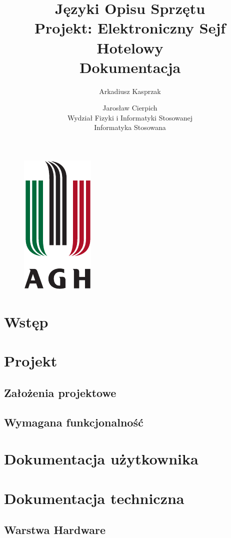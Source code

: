 \documentclass[12pt] {article}
\title {
	Języki Opisu Sprzętu \\
	\large Projekt: Elektroniczny Sejf Hotelowy \\
	Dokumentacja}
\author {
	Arkadiusz Kasprzak \and Jarosław Cierpich \\
	Wydział Fizyki i Informatyki Stosowanej \\ 
	Informatyka Stosowana}
\begin{document}
\begin{figure}
\centering
\includegraphics[scale = 1.5]{res/agh_znk_wbr_cmyk}
\end{figure}

\maketitle

\newpage
\tableofcontents

\section{Wstęp}

\section{Projekt}
\subsection{Założenia projektowe}
\subsection{Wymagana funkcjonalność}

\section{Dokumentacja użytkownika}

\section{Dokumentacja techniczna}
\subsection{Warstwa Hardware}
\end{document}
